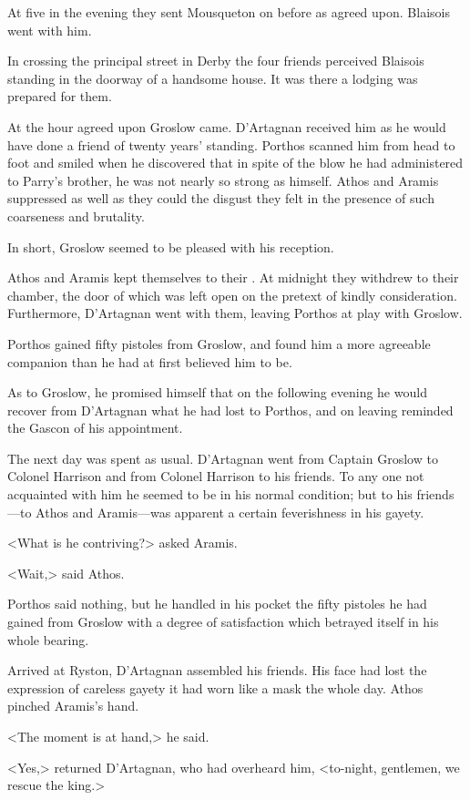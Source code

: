 At five in the evening they sent Mousqueton on before as agreed upon. Blaisois went with him.

In crossing the principal street in Derby the four friends perceived Blaisois standing in the doorway of a handsome house. It was there a lodging was prepared for them.

At the hour agreed upon Groslow came. D'Artagnan received him as he would have done a friend of twenty years' standing. Porthos scanned him from head to foot and smiled when he discovered that in spite of the blow he had administered to Parry's brother, he was not nearly so strong as himself. Athos and Aramis suppressed as well as they could the disgust they felt in the presence of such coarseness and brutality.

In short, Groslow seemed to be pleased with his reception.

Athos and Aramis kept themselves to their . At midnight they withdrew to their chamber, the door of which was left open on the pretext of kindly consideration. Furthermore, D'Artagnan went with them, leaving Porthos at play with Groslow.

Porthos gained fifty pistoles from Groslow, and found him a more agreeable companion than he had at first believed him to be.

As to Groslow, he promised himself that on the following evening he would recover from D'Artagnan what he had lost to Porthos, and on leaving reminded the Gascon of his appointment.

The next day was spent as usual. D'Artagnan went from Captain Groslow to Colonel Harrison and from Colonel Harrison to his friends. To any one not acquainted with him he seemed to be in his normal condition; but to his friends—to Athos and Aramis—was apparent a certain feverishness in his gayety.

<What is he contriving?> asked Aramis.

<Wait,> said Athos.

Porthos said nothing, but he handled in his pocket the fifty pistoles he had gained from Groslow with a degree of satisfaction which betrayed itself in his whole bearing.

Arrived at Ryston, D'Artagnan assembled his friends. His face had lost the expression of careless gayety it had worn like a mask the whole day. Athos pinched Aramis's hand.

<The moment is at hand,> he said.

<Yes,> returned D'Artagnan, who had overheard him, <to-night, gentlemen, we rescue the king.>

